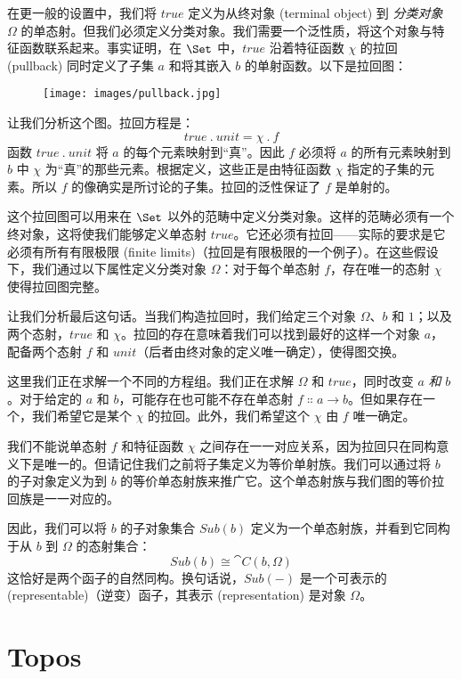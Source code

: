 在更一般的设置中，我们将 $\mathit{true}$ 定义为从终对象 (terminal object) 到 \emph{分类对象} $\Omega$ 的单态射。但我们必须定义分类对象。我们需要一个泛性质，将这个对象与特征函数联系起来。事实证明，在 $\Set$ 中，$\mathit{true}$ 沿着特征函数 $\chi$ 的拉回 (pullback) 同时定义了子集 $a$ 和将其嵌入 $b$ 的单射函数。以下是拉回图：

\begin{figure}[H]
  \centering
  \texttt{[image: images/pullback.jpg]}
\end{figure}

\noindent
让我们分析这个图。拉回方程是：
\[\mathit{true}\ .\ \mathit{unit} = \chi\ .\ f\]
函数 $\mathit{true}\ .\ \mathit{unit}$ 将 $a$ 的每个元素映射到“真”。因此 $f$ 必须将 $a$ 的所有元素映射到 $b$ 中 $\chi$ 为“真”的那些元素。根据定义，这些正是由特征函数 $\chi$ 指定的子集的元素。所以 $f$ 的像确实是所讨论的子集。拉回的泛性保证了 $f$ 是单射的。

这个拉回图可以用来在 $\Set$ 以外的范畴中定义分类对象。这样的范畴必须有一个终对象，这将使我们能够定义单态射 $\mathit{true}$。它还必须有拉回——实际的要求是它必须有所有有限极限 (finite limits)（拉回是有限极限的一个例子）。在这些假设下，我们通过以下属性定义分类对象 $\Omega$：对于每个单态射 $f$，存在唯一的态射 $\chi$ 使得拉回图完整。

让我们分析最后这句话。当我们构造拉回时，我们给定三个对象 $\Omega$、$b$ 和 $1$；以及两个态射，$\mathit{true}$ 和 $\chi$。拉回的存在意味着我们可以找到最好的这样一个对象 $a$，配备两个态射 $f$ 和 $\mathit{unit}$（后者由终对象的定义唯一确定），使得图交换。

这里我们正在求解一个不同的方程组。我们正在求解 $\Omega$ 和 $\mathit{true}$，同时改变 $a$ \emph{和} $b$。对于给定的 $a$ 和 $b$，可能存在也可能不存在单态射 $f \Colon a \to b$。但如果存在一个，我们希望它是某个 $\chi$ 的拉回。此外，我们希望这个 $\chi$ 由 $f$ 唯一确定。

我们不能说单态射 $f$ 和特征函数 $\chi$ 之间存在一一对应关系，因为拉回只在同构意义下是唯一的。但请记住我们之前将子集定义为等价单射族。我们可以通过将 $b$ 的子对象定义为到 $b$ 的等价单态射族来推广它。这个单态射族与我们图的等价拉回族是一一对应的。

因此，我们可以将 $b$ 的子对象集合 $\mathit{Sub}(b)$ 定义为一个单态射族，并看到它同构于从 $b$ 到 $\Omega$ 的态射集合：
\[\mathit{Sub}(b) \cong \cat{C}(b, \Omega)\]
这恰好是两个函子的自然同构。换句话说，$\mathit{Sub}(-)$ 是一个可表示的 (representable)（逆变）函子，其表示 (representation) 是对象 $\Omega$。

\section{Topos}

